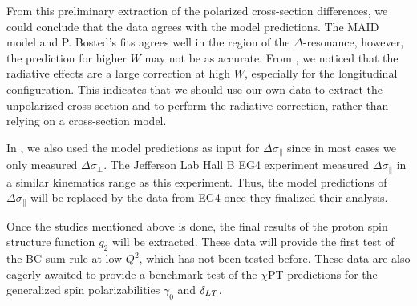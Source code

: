 From this preliminary extraction of the polarized cross-section differences, we could conclude that the data agrees with the model predictions. The MAID model and P. Bosted's fits agrees well in the region of the $\Delta$-resonance, however, the prediction for higher $W$ may not be as accurate. From , we noticed that the radiative effects are a large correction at high $W$, especially for the longitudinal configuration. This indicates that we should use our own data to extract the unpolarized cross-section and to perform the radiative correction, rather than relying on a cross-section model.

In , we also used the model predictions as input for $\Delta\sigma_{\parallel}$ since in most cases we only measured $\Delta\sigma_{\perp}$. The Jefferson Lab Hall B EG4 experiment measured $\Delta\sigma_{\parallel}$ in a similar kinematics range as this experiment. Thus, the model predictions of $\Delta\sigma_{\parallel}$ will be replaced by the data from EG4 once they finalized their analysis.

Once the studies mentioned above is done, the final results of the proton spin structure function $g_2$ will be extracted. These data will provide the first test of the BC sum rule at low $Q^2$, which has not been tested before. These data are also eagerly awaited to provide a benchmark test of the $\chi$PT predictions for the generalized spin polarizabilities $\gamma_0$ and $\delta_{LT}$.

